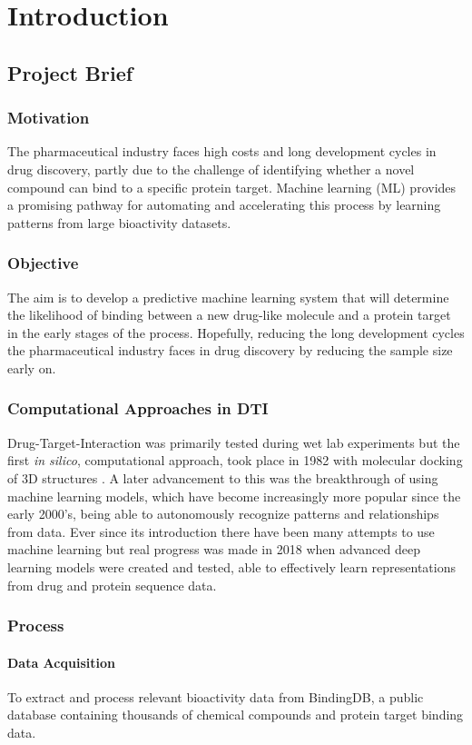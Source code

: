 \chapter{Introduction}
\section{Project Brief}
\subsection{Motivation}
The pharmaceutical industry faces high costs and long development cycles in drug discovery, partly due to the challenge of identifying whether a novel compound can bind to a specific protein target. Machine learning (ML) provides a promising pathway for automating and accelerating this process by learning patterns from large bioactivity datasets. 
\subsection{Objective}
The aim is to develop a predictive machine learning system that will determine the likelihood of binding between a new drug-like molecule and a protein target in the early stages of the process. Hopefully, reducing the long development cycles the pharmaceutical industry faces in drug discovery by reducing the sample size early on.
\subsection{Computational Approaches in DTI}
Drug-Target-Interaction was primarily tested during wet lab experiments but the first \textit{in silico}, computational approach, took place in 1982 with molecular docking of 3D structures \citep{Ru2025InSilicoDTI}. A later advancement to this was the breakthrough of using machine learning models, which have become increasingly more popular since the early 2000's, being able to autonomously recognize patterns and relationships from data. Ever since its introduction there have been many attempts to use machine learning but real progress was made in 2018 \citep{Ozturk2018} when advanced deep learning models were created and tested, able to effectively learn representations from drug and protein sequence data.
\subsection{Process}
\subsubsection{Data Acquisition}
To extract and process relevant bioactivity data from BindingDB, a public database containing thousands of chemical compounds and protein target binding data.
